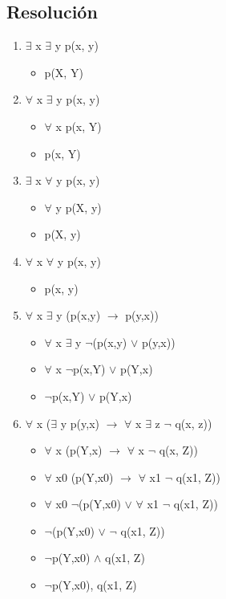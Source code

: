 \documentclass[a4paper,10pt]{article}
\begin{document}
\subsection{Resolución}
\begin{enumerate}
	\item $\exists$ x $\exists$ y p(x, y)
	\begin{itemize}
		\item p(X, Y)
	\end{itemize}
	\item $\forall$ x $\exists$ y p(x, y)
	\begin{itemize}
		\item $\forall$ x p(x, Y)
		\item p(x, Y)
	\end{itemize}
	\item $\exists$ x $\forall$ y p(x, y)
	\begin{itemize}
		\item $\forall$ y p(X, y)
		\item p(X, y)
	\end{itemize}
	\item $\forall$ x $\forall$ y p(x, y)
	\begin{itemize}
		\item p(x, y)
	\end{itemize}
	\item $\forall$ x $\exists$ y (p(x,y) $\rightarrow$ p(y,x))
	\begin{itemize}
		\item $\forall$ x $\exists$ y $\lnot$(p(x,y) $\lor$ p(y,x))
		\item $\forall$ x $\lnot$p(x,Y) $\lor$ p(Y,x)
		\item $\lnot$p(x,Y) $\lor$ p(Y,x)
	\end{itemize}
	\item $\forall$ x ($\exists$ y p(y,x) $\rightarrow$ $\forall$ x $\exists$ z $\lnot$ q(x, z))
	\begin{itemize}
		\item $\forall$ x (p(Y,x) $\rightarrow$ $\forall$ x $\lnot$ q(x, Z))
		\item $\forall$ x0 (p(Y,x0) $\rightarrow$ $\forall$ x1 $\lnot$ q(x1, Z))
		\item $\forall$ x0 $\lnot$(p(Y,x0) $\lor$ $\forall$ x1 $\lnot$ q(x1, Z))
		\item $\lnot$(p(Y,x0) $\lor$ $\lnot$ q(x1, Z))
		\item $\lnot$p(Y,x0) $\land$ q(x1, Z)
		\item $\lnot$p(Y,x0), q(x1, Z)

\end{itemize}
\end{enumerate}
\end{document}
